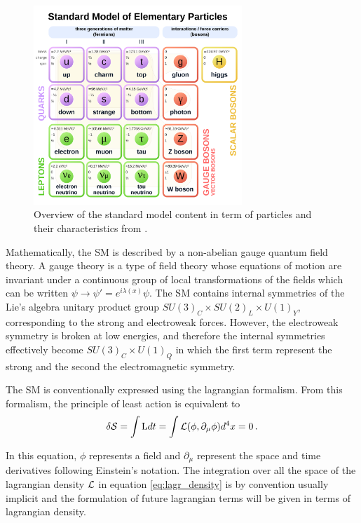 \begin{figure}
    \centering
    \includegraphics[width=0.7\textwidth]{Images/SM_zoo.png}
    \caption{Overview of the standard model content in term of particles and their characteristics from \cite{SMschema}.}
    \label{fig:SM}
\end{figure}

Mathematically, the SM is described by a non-abelian gauge quantum field theory. A gauge theory is a type of field theory whose equations of motion are invariant under a continuous group of local transformations of the fields which can be written $\psi \rightarrow \psi' = e^{i\lambda(x)}\psi$. The SM contains internal symmetries of the Lie's algebra unitary product group $SU(3)_C \times SU(2)_L \times U(1)_Y$, corresponding to the strong and electroweak forces. However, the electroweak symmetry is broken at low energies, and therefore the internal symmetries effectively become $SU(3)_C \times U(1)_Q$ in which the first term represent the strong and the second the electromagnetic symmetry.

The SM is conventionally expressed using the lagrangian formalism. From this formalism, the principle of least action is equivalent to \cite{Thomson:2013zua}
\begin{equation}
    \delta \mathcal{S} = \int \mathrm{L} dt = \int \Lagr(\phi,\partial_{\mu}\phi) d^4 x = 0 \mend
    \label{eq:lagr_density}
\end{equation}

In this equation, $\phi$ represents a field and $\partial_{\mu}$ represent the space and time derivatives following Einstein's notation. The integration over all the space of the lagrangian density $\mathcal{L}$ in equation \ref{eq:lagr_density} is by convention usually implicit and the formulation of future lagrangian terms will be given in terms of lagrangian density.


